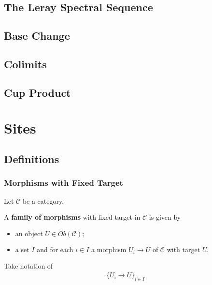 \documentclass[Total.tex]{subfiles}
\begin{document}
			\section{The Leray Spectral Sequence}
			\section{Base Change}
			\section{Colimits}
			\section{Cup Product}
		\chapter{Sites}
			\section{Definitions}
				\subsection{Morphisms with Fixed Target}
					\begin{Def}
						Let $\mathcal{C}$ be a category.
						
						A \textbf{family of morphisms} with fixed target in $\mathcal{C}$ is given by
						\begin{itemize}
							\item an object $U\in Ob(\mathcal{C})$;
							\item a set $I$ and for each $i\in I$ a morphism $U_i\rightarrow U$ of $\mathcal{C}$ with target $U$.
						\end{itemize}
						Take notation of
						\begin{gather*}
							\{U_i\rightarrow U\}_{i\in I}
						\end{gather*}
					\end{Def}
\end{document}
